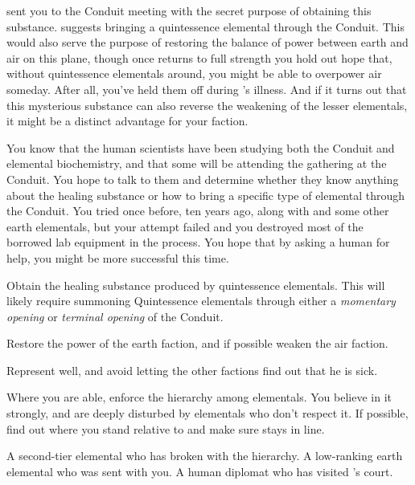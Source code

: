 \documentclass[char]{elementals}
\begin{document}
\cEarthKing{} sent you to the Conduit meeting with the secret purpose of obtaining this substance.  \cEarthKing{\They} suggests bringing a quintessence elemental through the Conduit.  This would also serve the purpose of restoring the balance of power between earth and air on this plane, though once \cEarthKing{} returns to full strength you hold out hope that, without quintessence elementals around, you might be able to overpower air someday.  After all, you've held them off during \cEarthKing{}'s illness.  And if it turns out that this mysterious substance can also reverse the weakening of the lesser elementals, it might be a distinct advantage for your faction.

You know that the human scientists have been studying both the Conduit and elemental biochemistry, and that some will be attending the gathering at the Conduit.  You hope to talk to them and determine whether they know anything about the healing substance or how to bring a specific type of elemental through the Conduit.  You tried once before, ten years ago, along with \cMinion{} and some other earth elementals, but your attempt failed and you destroyed most of the borrowed lab equipment in the  process.  You hope that by asking a human for help, you might be more successful this time.

\begin{itemz}[Goals]
	\item Obtain the healing substance produced by quintessence elementals. This will likely require summoning Quintessence elementals through either a \emph{momentary opening} or \emph{terminal opening} of the Conduit.
	\item Restore the power of the earth faction, and if possible weaken the air faction.
	\item Represent \cEarthKing{} well, and avoid letting the other factions find out that he is sick.
	\item Where you are able, enforce the hierarchy among elementals.  You believe in it strongly, and are deeply disturbed by elementals who don't respect it.  If possible, find out where you stand relative to \cRogue{} and make sure \cMinion{} stays in line.
\end{itemz}
 
\begin{contacts}
	\contact{\cRogue{}}  A second-tier elemental who has broken with the hierarchy.
	\contact{\cMinion{}}  A low-ranking earth elemental who was sent with you.
  \contact{\cAvatar{}}  A human diplomat who has visited \cEarthKing{}'s court.
\end{contacts} 
\end{document}
